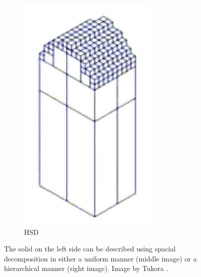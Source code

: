 \begin{description}
\begin{figure}[H]
\begin{subfigure}[b]{0.2\textwidth}
			\includegraphics[width=\textwidth]{images/spatial_decomposition_hsd}
			\caption{HSD}
			\label{fig:spatial_decomposition_hsd}
		\end{subfigure}
		\caption{
			The solid on the left side can be described using spacial decomposition in either a uniform manner (middle image) or a hierarchical manner (right image).
			Image by Tukora \cite{virtual_machining_review}. 
		}
		\label{fig:spatial_decomposition}
	\end{figure}
	


\end{description}
